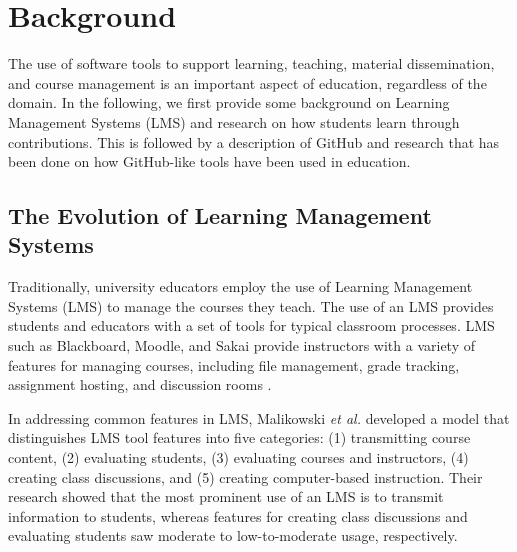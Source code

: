 



\section{Background}
The use of software tools to support learning, teaching, material dissemination, and course management is an important aspect of education, regardless of the domain.  In the following, we first provide some background on Learning Management Systems (LMS) and research on how students learn through contributions.   This is followed by a description of GitHub and research that has been done on how GitHub-like tools have been used in education. 

\subsection{The Evolution of Learning Management Systems}
Traditionally, university educators employ the use of Learning Management Systems (LMS) to manage the courses they teach. The use of an LMS provides students and educators with a set of tools for typical classroom processes. LMS such as Blackboard, Moodle, and Sakai provide instructors with a variety of features for managing courses, including file management, grade tracking, assignment hosting, and discussion rooms \cite{kumar2011comparative}.

In addressing common features in LMS, Malikowski \emph{et al.} \cite{malikowski2007model} developed a model that distinguishes LMS tool features into five categories: (1) transmitting course content, (2) evaluating students, (3) evaluating courses and instructors, (4) creating class discussions, and (5) creating computer-based instruction. 
%
Their research showed that the most prominent use of an LMS is to transmit information to students, whereas features for creating class discussions and evaluating students saw moderate to low-to-moderate usage, respectively.

